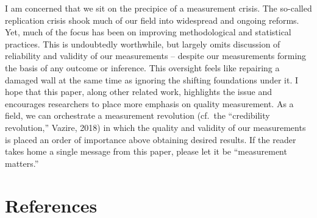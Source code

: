 \documentclass[
  man,floatsintext]{apa6}
\begin{document}
I am concerned that we sit on the precipice of a measurement crisis. The so-called replication crisis shook much of our field into widespread and ongoing reforms. Yet, much of the focus has been on improving methodological and statistical practices. This is undoubtedly worthwhile, but largely omits discussion of reliability and validity of our measurements -- despite our measurements forming the basis of any outcome or inference. This oversight feels like repairing a damaged wall at the same time as ignoring the shifting foundations under it. I hope that this paper, along other related work, highlights the issue and encourages researchers to place more emphasis on quality measurement. As a field, we can orchestrate a measurement revolution (cf.~the ``credibility revolution,'' Vazire, 2018) in which the quality and validity of our measurements is placed an order of importance above obtaining desired results. If the reader takes home a single message from this paper, please let it be ``measurement matters.''

\newpage

\hypertarget{references}{%
\section{References}\label{references}}

\begingroup
\setlength{\parindent}{-0.5in}
\setlength{\leftskip}{0.1in}
\end{document}
